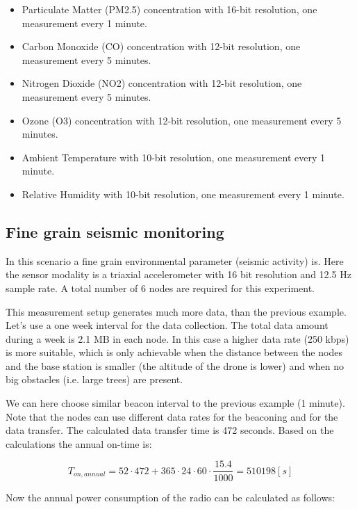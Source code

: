 \documentclass[conference]{IEEEtran}
\begin{document}
\begin{itemize}
	\item{Particulate Matter (PM2.5) concentration with 16-bit resolution, one measurement every 1 minute.}
	\item{Carbon Monoxide (CO) concentration with 12-bit resolution, one measurement every 5 minutes.}
	\item{Nitrogen Dioxide (NO2) concentration with 12-bit resolution, one measurement every 5 minutes.}
	\item{Ozone (O3) concentration with 12-bit resolution, one measurement every 5 minutes.}
	\item{Ambient Temperature with 10-bit resolution, one measurement every 1 minute.}
	\item{Relative Humidity with 10-bit resolution, one measurement every 1 minute.}
\end{itemize}

\subsection{Fine grain seismic monitoring}

In this scenario a fine grain environmental parameter (seismic activity) is. Here the
sensor modality is a triaxial accelerometer with 16 bit resolution and 12.5 Hz
sample rate. A total number of 6 nodes are required for this experiment.

This measurement setup generates much more data, than the previous example. Let's
use a one week interval for the data collection. The total data amount during
a week is 2.1 MB in each node. In this case a higher data rate (250 kbps) is more
suitable, which is only achievable when the distance between the nodes and the
base station is smaller (the altitude of the drone is lower) and when no big
obstacles (i.e. large trees) are present.

We can here choose similar beacon interval to the previous example (1 minute). Note
that the nodes can use different data rates for the beaconing and for the
data transfer. The calculated data transfer time is 472 seconds. Based on
the calculations the annual on-time is:

\begin{equation}
    T_{on,annual} = 52 \cdot 472 + 365 \cdot 24 \cdot 60 \cdot \frac{15.4}{1000} = 510198 [s]
\end{equation}

Now the annual power consumption of the radio can be calculated as
follows:
\end{document}
